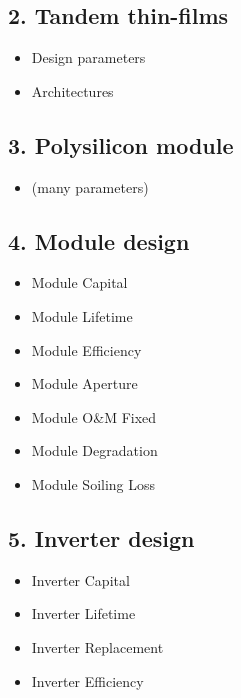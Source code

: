 \documentclass[letterpaper,10pt,english]{sphinxmanual}
\begin{document}
\subsection{2. Tandem thin-films}
\label{\detokenize{mock-foa:tandem-thin-films}}\begin{itemize}
\item {} 
Design parameters

\item {} 
Architectures

\end{itemize}


\subsection{3. Polysilicon module}
\label{\detokenize{mock-foa:polysilicon-module}}\begin{itemize}
\item {} 
(many parameters)

\end{itemize}


\subsection{4. Module design}
\label{\detokenize{mock-foa:module-design}}\begin{itemize}
\item {} 
Module Capital

\item {} 
Module Lifetime

\item {} 
Module Efficiency

\item {} 
Module Aperture

\item {} 
Module O\&M Fixed

\item {} 
Module Degradation

\item {} 
Module Soiling Loss

\end{itemize}


\subsection{5. Inverter design}
\label{\detokenize{mock-foa:inverter-design}}\begin{itemize}
\item {} 
Inverter Capital

\item {} 
Inverter Lifetime

\item {} 
Inverter Replacement

\item {} 
Inverter Efficiency

\end{itemize}
\end{document}
